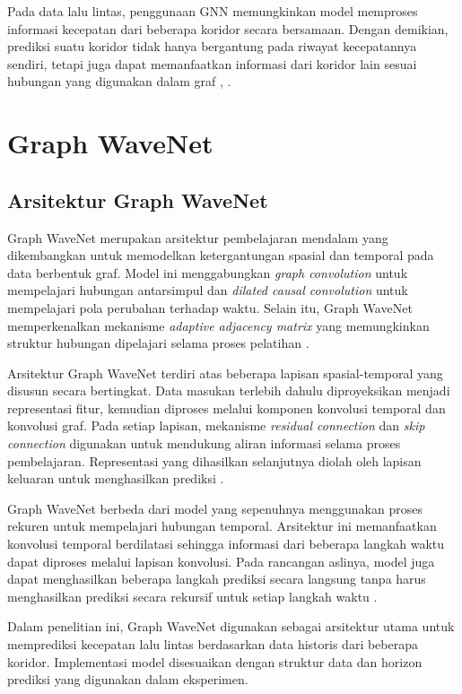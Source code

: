 Pada data lalu lintas, penggunaan GNN memungkinkan model memproses informasi kecepatan dari beberapa koridor secara bersamaan. Dengan demikian, prediksi suatu koridor tidak hanya bergantung pada riwayat kecepatannya sendiri, tetapi juga dapat memanfaatkan informasi dari koridor lain sesuai hubungan yang digunakan dalam graf \cite{jiang2022gnntraffic}, \cite{yu2018stgcn}.


\section{Graph WaveNet}
\label{sec:graph_wavenet}

\subsection{Arsitektur Graph WaveNet}
\label{subsec:arsitektur_graph_wavenet}

Graph WaveNet merupakan arsitektur pembelajaran mendalam yang dikembangkan untuk memodelkan ketergantungan spasial dan temporal pada data berbentuk graf. Model ini menggabungkan \textit{graph convolution} untuk mempelajari hubungan antarsimpul dan \textit{dilated causal convolution} untuk mempelajari pola perubahan terhadap waktu. Selain itu, Graph WaveNet memperkenalkan mekanisme \textit{adaptive adjacency matrix} yang memungkinkan struktur hubungan dipelajari selama proses pelatihan \cite{wu2019graphwavenet}.

Arsitektur Graph WaveNet terdiri atas beberapa lapisan spasial-temporal yang disusun secara bertingkat. Data masukan terlebih dahulu diproyeksikan menjadi representasi fitur, kemudian diproses melalui komponen konvolusi temporal dan konvolusi graf. Pada setiap lapisan, mekanisme \textit{residual connection} dan \textit{skip connection} digunakan untuk mendukung aliran informasi selama proses pembelajaran. Representasi yang dihasilkan selanjutnya diolah oleh lapisan keluaran untuk menghasilkan prediksi \cite{wu2019graphwavenet}.

Graph WaveNet berbeda dari model yang sepenuhnya menggunakan proses rekuren untuk mempelajari hubungan temporal. Arsitektur ini memanfaatkan konvolusi temporal berdilatasi sehingga informasi dari beberapa langkah waktu dapat diproses melalui lapisan konvolusi. Pada rancangan aslinya, model juga dapat menghasilkan beberapa langkah prediksi secara langsung tanpa harus menghasilkan prediksi secara rekursif untuk setiap langkah waktu \cite{wu2019graphwavenet}.

Dalam penelitian ini, Graph WaveNet digunakan sebagai arsitektur utama untuk memprediksi kecepatan lalu lintas berdasarkan data historis dari beberapa koridor. Implementasi model disesuaikan dengan struktur data dan horizon prediksi yang digunakan dalam eksperimen.


